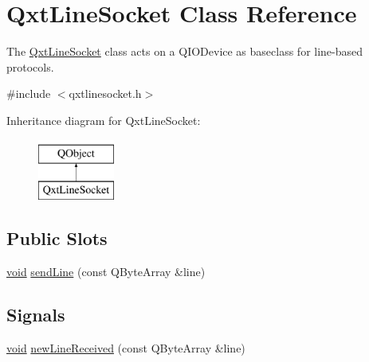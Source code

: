 \hypertarget{class_qxt_line_socket}{\section{Qxt\-Line\-Socket Class Reference}
\label{class_qxt_line_socket}
}


The \hyperlink{class_qxt_line_socket}{Qxt\-Line\-Socket} class acts on a Q\-I\-O\-Device as baseclass for line-\/based protocols.  




{\ttfamily \#include $<$qxtlinesocket.\-h$>$}

Inheritance diagram for Qxt\-Line\-Socket\-:\begin{figure}[H]
\begin{center}
\leavevmode
\includegraphics[height=2.000000cm]{class_qxt_line_socket}
\end{center}
\end{figure}
\subsection*{Public Slots}
\begin{DoxyCompactItemize}
\item 
\hyperlink{group___u_a_v_objects_plugin_ga444cf2ff3f0ecbe028adce838d373f5c}{void} \hyperlink{class_qxt_line_socket_af6042ac869a18163e8898b16845f4b91}{send\-Line} (const Q\-Byte\-Array \&line)
\end{DoxyCompactItemize}
\subsection*{Signals}
\begin{DoxyCompactItemize}
\item 
\hyperlink{group___u_a_v_objects_plugin_ga444cf2ff3f0ecbe028adce838d373f5c}{void} \hyperlink{class_qxt_line_socket_a4daaa3396964f16cdd8526d3306b453f}{new\-Line\-Received} (const Q\-Byte\-Array \&line)
\end{DoxyCompactItemize}
